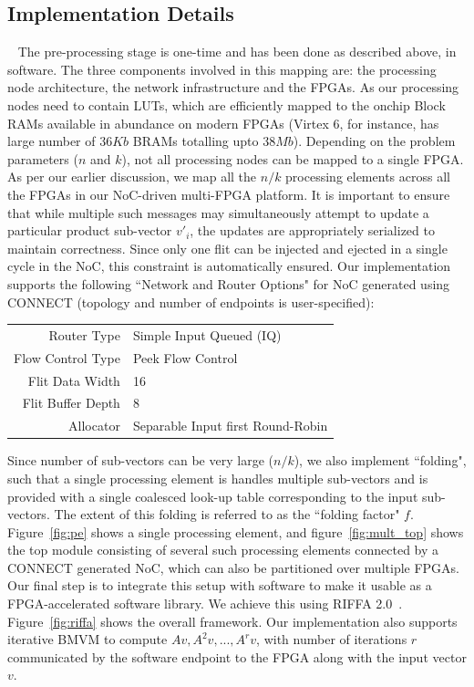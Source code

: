 \documentclass[conference, 9pt]{IEEEtran}
\newcommand{\red}[1]{\textcolor{red}{#1}}
\begin{document}
\subsection{Implementation Details}~\label{sec:Impl}
The pre-processing stage is one-time and has been done
as described above, in software.
The three components involved in this mapping are: the processing node architecture, the network infrastructure and the FPGAs.
As our processing nodes need to contain LUTs, which are efficiently mapped to the onchip Block RAMs available in abundance on modern FPGAs (Virtex 6, for instance, has large number of 
$36Kb$ BRAMs totalling  upto $38 Mb$). Depending on the problem parameters ($n$ and $k$), not all processing nodes can be mapped to a single FPGA.
As per our earlier discussion, we map all the $n/k$ processing elements across all the FPGAs in our NoC-driven multi-FPGA platform. 
It is important to  ensure that while multiple such messages may simultaneously attempt to update a 
particular product sub-vector $v'_i$, the updates are appropriately serialized 
to maintain correctness. Since only one flit can be injected and ejected in a 
single cycle in the NoC, this constraint is automatically ensured. Our 
implementation supports the following ``Network and Router Options" for NoC 
generated using CONNECT (topology and number of endpoints is user-specified):
\begin{center}
 \begin{tabular}{|r|l|}
 \hline
	{Router Type} & Simple Input Queued (IQ)\\
	{Flow Control Type}& Peek Flow Control\\
	{Flit Data Width}& 16\\
	{Flit Buffer Depth}& 8\\
	{Allocator}& Separable Input first Round-Robin\\
\hline
 \end{tabular}
\end{center}

Since number of sub-vectors can be very large ($n/k$), we also implement ``folding", such that a single processing element is handles multiple sub-vectors and is provided with a single coalesced look-up table corresponding to the input sub-vectors. The extent of this folding is referred to as the ``folding factor" $f$. Figure~\ref{fig:pe} shows a single processing element, and figure~\ref{fig:mult_top} shows the top module consisting of several such processing elements connected by a CONNECT generated NoC, which can also be partitioned over multiple FPGAs. Our final step is to integrate this setup with software to make it usable as a FPGA-accelerated software library. We achieve this using RIFFA 2.0~\cite{jacobsen2013riffa}. Figure~\ref{fig:riffa} shows the overall framework. Our implementation also supports iterative BMVM to compute $Av, A^{2}v, ... , A^{r}v$, with number of iterations $r$ communicated by the software endpoint to the FPGA along with the input vector $v$. 
\end{document}
